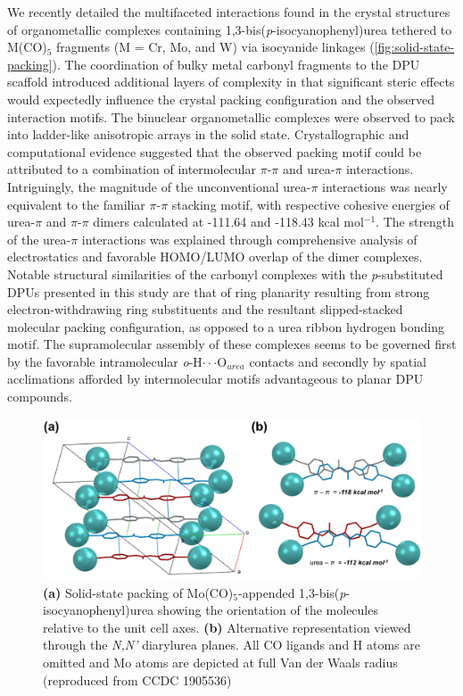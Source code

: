 We recently detailed the multifaceted interactions found in the crystal structures of organometallic complexes containing 1,3-bis(\textit{p}-isocyanophenyl)urea tethered to M(CO)$_{5}$ fragments (M = Cr, Mo, and W) via isocyanide linkages (\autoref{fig:solid-state-packing}). The coordination of bulky metal carbonyl fragments to the DPU scaffold introduced additional layers of complexity in that significant steric effects would expectedly influence the crystal packing configuration and the observed interaction motifs. The binuclear organometallic complexes were observed to pack into ladder-like anisotropic arrays in the solid state. Crystallographic and computational evidence suggested that the observed packing motif could be attributed to a combination of intermolecular $\pi$-$\pi$ and urea-$\pi$ interactions. Intriguingly, the magnitude of the unconventional urea-$\pi$ interactions was nearly equivalent to the familiar $\pi$-$\pi$ stacking motif, with respective cohesive energies of urea-$\pi$ and $\pi$-$\pi$ dimers calculated at -111.64 and -118.43 kcal mol$^{-1}$. The strength of the urea-$\pi$ interactions was explained through comprehensive analysis of electrostatics and favorable HOMO/LUMO overlap of the dimer complexes. Notable structural similarities of the carbonyl complexes with the \textit{p}-substituted DPUs presented in this study are that of ring planarity resulting from strong electron-withdrawing ring substituents and the resultant slipped-stacked molecular packing configuration, as opposed to a urea ribbon hydrogen bonding motif. The supramolecular assembly of these complexes seems to be governed first by the favorable intramolecular \textit{o}-H$\cdot \cdot \cdot$O$_{urea}$ contacts and secondly by spatial acclimations afforded by intermolecular motifs advantageous to planar DPU compounds.


\begin{figure}[h!]
    \centering
    \includegraphics[width=0.8\linewidth]{figures/pub3/Picture7.png}
    \caption{\textbf{(a)} Solid-state packing of Mo(CO)$_{5}$-appended 1,3-bis(\textit{p}-isocyanophenyl)urea showing the orientation of the molecules relative to the unit cell axes. \textbf{(b)} Alternative representation viewed through the \textit{N,N'} diarylurea planes. All CO ligands and H atoms are omitted and Mo atoms are depicted at full Van der Waals radius (reproduced from CCDC 1905536) \citep{Millard2019a}}\label{fig:solid-state-packing}
\end{figure}

